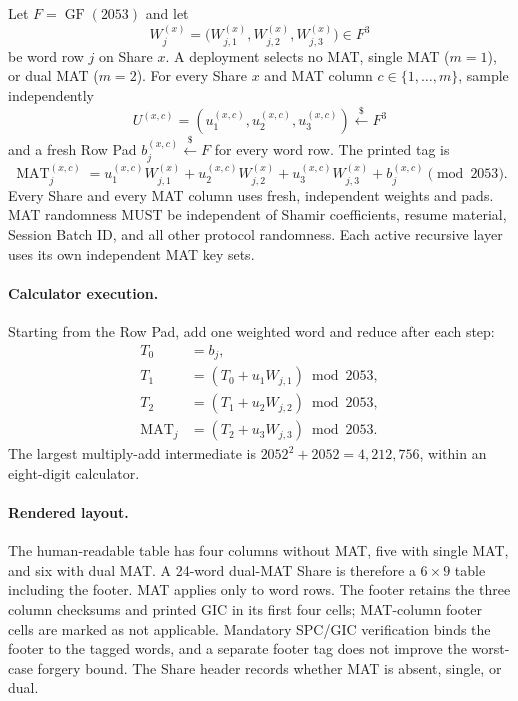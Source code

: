 \documentclass[11pt]{article}
\newcommand{\GF}{\operatorname{GF}}
\begin{document}
Let $F=\GF(2053)$ and let
\[
    W_j^{(x)}=\bigl(W_{j,1}^{(x)},W_{j,2}^{(x)},W_{j,3}^{(x)}\bigr)\in F^3
\]
be word row $j$ on Share $x$. A deployment selects no MAT, single MAT ($m=1$), or dual MAT ($m=2$). For every Share $x$ and MAT column $c\in\{1,\ldots,m\}$, sample independently
\[
    U^{(x,c)}=(u_1^{(x,c)},u_2^{(x,c)},u_3^{(x,c)})\xleftarrow{\$}F^3
\]
and a fresh Row Pad $b_j^{(x,c)}\xleftarrow{\$}F$ for every word row. The printed tag is
\begin{equation}
    \operatorname{MAT}_{j}^{(x,c)}
    =
    u_1^{(x,c)}W_{j,1}^{(x)}
    + u_2^{(x,c)}W_{j,2}^{(x)}
    + u_3^{(x,c)}W_{j,3}^{(x)}
    + b_j^{(x,c)}
    \pmod{2053}.
    \label{eq:mat}
\end{equation}
Every Share and every MAT column uses fresh, independent weights and pads. MAT randomness MUST be independent of Shamir coefficients, resume material, Session Batch ID, and all other protocol randomness. Each active recursive layer uses its own independent MAT key sets.

\paragraph{Calculator execution.} Starting from the Row Pad, add one weighted word and reduce after each step:
\[
\begin{aligned}
T_0 &= b_j,\\
T_1 &= (T_0+u_1W_{j,1})\bmod2053,\\
T_2 &= (T_1+u_2W_{j,2})\bmod2053,\\
\operatorname{MAT}_j &= (T_2+u_3W_{j,3})\bmod2053.
\end{aligned}
\]
The largest multiply-add intermediate is $2052^2+2052=4{,}212{,}756$, within an eight-digit calculator.

\paragraph{Rendered layout.} The human-readable table has four columns without MAT, five with single MAT, and six with dual MAT. A 24-word dual-MAT Share is therefore a $6\times9$ table including the footer. MAT applies only to word rows. The footer retains the three column checksums and printed GIC in its first four cells; MAT-column footer cells are marked as not applicable. Mandatory SPC/GIC verification binds the footer to the tagged words, and a separate footer tag does not improve the worst-case forgery bound. The Share header records whether MAT is absent, single, or dual.
\end{document}
